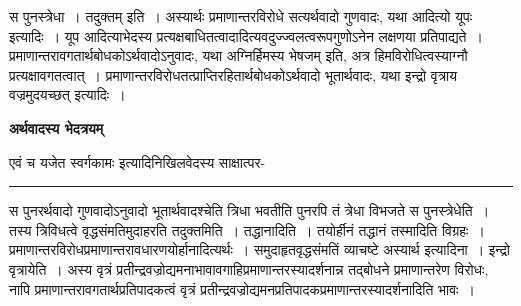 \documentclass[11pt, openany]{book}
\begin{document}
{\bl स पुनस्त्रेधा~। तदुक्तम्  इति~। अस्यार्थः {\qtl प्रमाणान्तरविरोधे सत्यर्थवादो गुणवादः}, यथा {\qtl आदित्यो यूपः} इत्यादिः~। यूप आदित्याभेदस्य प्रत्यक्षबाधितत्वादादित्यवदुज्ज्वलत्वरूपगुणोऽनेन लक्षणया प्रतिपाद्यते~। {\qtl प्रमाणान्तरावगतार्थबोधकोऽर्थवादोऽनुवादः}, यथा {\qtl अग्निर्हिमस्य भेषजम्}  इति,  अत्र हिमविरोधित्वस्याग्नौ प्रत्यक्षावगतत्वात्~। प्रमाणान्तरविरोधतत्प्राप्तिरहितार्थबोधकोऽर्थवादो भूतार्थवादः, {\qtl यथा इन्द्रो वृत्राय वज्रमुदयच्छत्} इत्यादिः~।}
\begin{center}
 \textbf{अर्थवादस्य भेदत्रयम् }   
\end{center}
 
{\bl एवं च {\qtl यजेत स्वर्गकामः} इत्यादिनिखिलवेदस्य साक्षात्पर-\\}
\hrule
\vspace{3mm}

 स पुनरर्थवादो गुणवादोऽनुवादो भूतार्थवादश्चेति त्रिधा भवतीति पुनरपि तं त्रेधा विभजते {\br स पुनस्त्रेधेति~।} तस्य त्रिविधत्वे वृद्धसंमतिमुदाहरति {\br तदुक्तमिति~। तद्धानादिति~।} तयोर्हीनं तद्धानं तस्मादिति विग्रहः~। प्रमाणान्तरविरोधप्रमाणान्तरावधारणयोर्हानादित्यर्थः~। समुदाहृतवृद्धसंमतिं  व्याचष्टे {\br अस्यार्थ इत्यादिना~। इन्द्रो वृत्रायेति~।} अस्य वृत्रं प्रतीन्द्रवज्रोद्यमनाभावावगाहिप्रमाणान्तरस्यादर्शनान्न तद्बोधने प्रमाणान्तरेण विरोधः, नापि प्रमाणान्तरावगतार्थप्रतिपादकत्वं वृत्रं
प्रतीन्द्रवज्रोद्यमनप्रतिपादकप्रमाणान्तरस्यादर्शनादिति भावः~।\\
\end{document}
